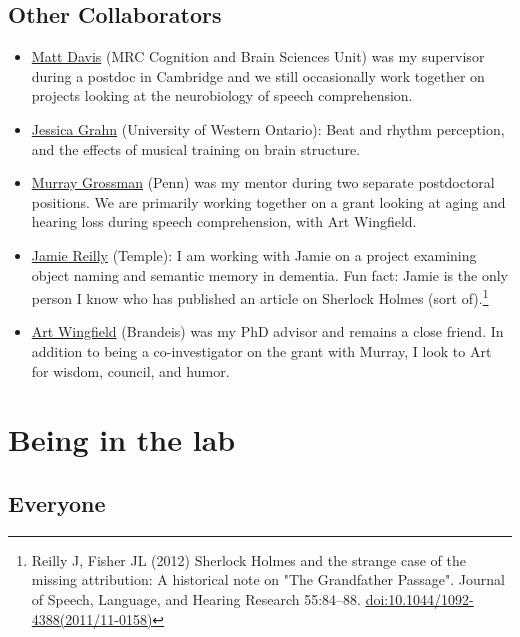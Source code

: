 \documentclass[letterpaper,12pt,oneside]{memoir}
\begin{document}
\section{Other Collaborators}
\begin{itemize}
\item{\href{http://www.mrc-cbu.cam.ac.uk/people/matt.davis/}{Matt Davis} (MRC Cognition and Brain Sciences Unit) was my supervisor during a postdoc in Cambridge and we still occasionally work together on projects looking at the neurobiology of speech comprehension.}
\item{\href{http://www.jessicagrahn.com}{Jessica Grahn} (University of Western Ontario): Beat and rhythm perception, and the effects of musical training on brain structure.}
\item{\href{http://ftd.med.upenn.edu/}{Murray Grossman} (Penn) was my mentor during two separate postdoctoral positions. We are primarily working together on a grant looking at aging and hearing loss during speech comprehension, with Art Wingfield.}
\item{\href{http://www.reilly-coglab.com}{Jamie Reilly} (Temple): I am working with Jamie on a project examining object naming and semantic memory in dementia. Fun fact: Jamie is the only person I know who has published an article on Sherlock Holmes (sort of).\footnote{Reilly J, Fisher JL (2012) Sherlock Holmes and the strange case of the missing attribution: A historical note on "The Grandfather Passage". Journal of Speech, Language, and Hearing Research 55:84--88. \href{http://dx.doi.org/10.1044/1092-4388(2011/11-0158)}{doi:10.1044/1092-4388(2011/11-0158)}}}
\item{\href{http://www.bio.brandeis.edu/faculty/wingfield.html}{Art Wingfield} (Brandeis) was my PhD advisor and remains a close friend. In addition to being a co-investigator on the grant with Murray, I look to Art for wisdom, council, and humor.}
\end{itemize}



\chapter{Being in the lab}




\section{Everyone}
\end{document}

